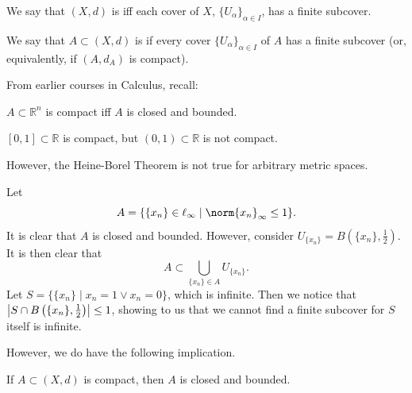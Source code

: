 \documentclass[notoc,notitlepage]{tufte-book}
\begin{document}
\begin{defn}[Compact]\label{defn:compact}
  We say that $(X, d)$ is  iff each cover of $X$, $\{ U_\alpha \}_{\alpha \in I}$, has a finite subcover.

  We say that $A \subset (X, d)$ is  if every cover $\{ U_\alpha \}_{\alpha \in I}$ of $A$ has a finite subcover (or, equivalently, if $(A, d_A)$ is compact).
\end{defn}

From earlier courses in Calculus, recall:

\begin{thm}\label{thm:heine_borel_theorem}
  $A \subset \mathbb{R}^n$ is compact iff $A$ is closed and bounded.
\end{thm}

\begin{eg}
  $[0, 1] \subset \mathbb{R}$ is compact, but $(0, 1) \subset \mathbb{R}$ is not compact.
\end{eg}

However, the Heine-Borel Theorem is not true for arbitrary metric spaces.

\begin{eg}[\imponote]
  Let
  \begin{equation*}
    A = \{ \{ x_n \} \in \ell_\infty \mid \norm{ x_n }_\infty \leq 1 \}.
  \end{equation*}
  It is clear that $A$ is closed and bounded. However, consider $U_{\{ x_n \}} = B \left( \{ x_n \}, \frac{1}{2} \right)$. It is then clear that
  \begin{equation*}
    A \subset \bigcup_{\{ x_n \} \in A } U_{\{ x_n \}}.
  \end{equation*}
  Let $S = \{ \{ x_n \} \mid x_n = 1 \lor x_n = 0 \}$, which is infinite. Then we notice that $\left| S \cap B \left( \{ x_n \}, \frac{1}{2} \right) \right| \leq 1$, showing to us that we cannot find a finite subcover for $S$ itself is infinite.
\end{eg}

However, we do have the following implication.

\begin{propo}\label{propo:compact_spaces_are_closed_and_bounded}
  If $A \subset (X, d)$ is compact, then $A$ is closed and bounded.
\end{propo}
\end{document}

